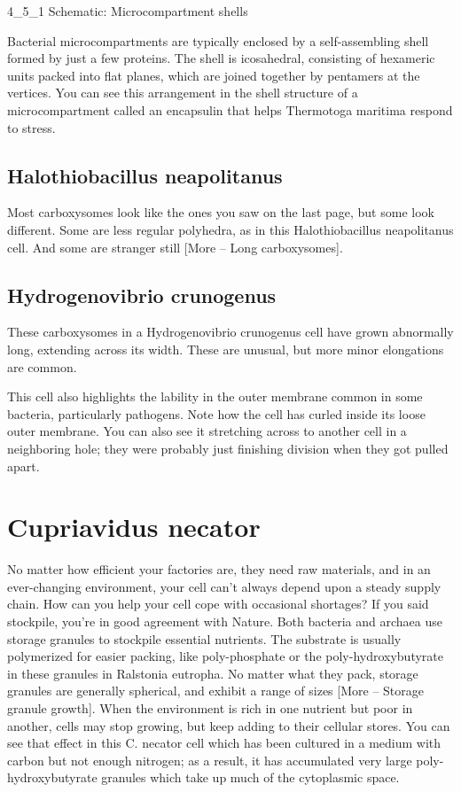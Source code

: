 \documentclass[]{tufte-book}
\begin{document}
4\_5\_1 Schematic: Microcompartment shells

Bacterial microcompartments are typically enclosed by a self-assembling
shell formed by just a few proteins. The shell is icosahedral,
consisting of hexameric units packed into flat planes, which are joined
together by pentamers at the vertices. You can see this arrangement in
the shell structure of a microcompartment called an encapsulin that
helps Thermotoga maritima respond to stress.

\subsection{Halothiobacillus neapolitanus}\label{Carboxysome_variety}

Most carboxysomes look like the ones you saw on the last page, but some
look different. Some are less regular polyhedra, as in this
Halothiobacillus neapolitanus cell. And some are stranger still {[}More
-- Long carboxysomes{]}.

\subsection{Hydrogenovibrio crunogenus}\label{Long_carboxysomes}

These carboxysomes in a Hydrogenovibrio crunogenus cell have grown
abnormally long, extending across its width. These are unusual, but more
minor elongations are common.

This cell also highlights the lability in the outer membrane common in
some bacteria, particularly pathogens. Note how the cell has curled
inside its loose outer membrane. You can also see it stretching across
to another cell in a neighboring hole; they were probably just finishing
division when they got pulled apart.

\section{Cupriavidus necator}\label{cupriavidus-necator-2}

No matter how efficient your factories are, they need raw materials, and
in an ever-changing environment, your cell can't always depend upon a
steady supply chain. How can you help your cell cope with occasional
shortages? If you said stockpile, you're in good agreement with Nature.
Both bacteria and archaea use storage granules to stockpile essential
nutrients. The substrate is usually polymerized for easier packing, like
poly-phosphate or the poly-hydroxybutyrate in these granules in
Ralstonia eutropha. No matter what they pack, storage granules are
generally spherical, and exhibit a range of sizes {[}More -- Storage
granule growth{]}. When the environment is rich in one nutrient but poor
in another, cells may stop growing, but keep adding to their cellular
stores. You can see that effect in this C. necator cell which has been
cultured in a medium with carbon but not enough nitrogen; as a result,
it has accumulated very large poly-hydroxybutyrate granules which take
up much of the cytoplasmic space.
\end{document}

